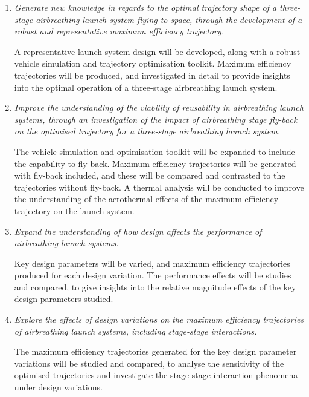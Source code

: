     \begin{enumerate}
    	 \item \emph{Generate new knowledge in regards to the optimal trajectory shape of a three-stage airbreathing launch system flying to space, through the development of a robust and representative maximum efficiency trajectory.}
    	 
    	 A representative launch system design will be developed, along with a robust vehicle simulation and trajectory optimisation toolkit. Maximum efficiency trajectories will be produced, and investigated in detail to provide insights into the optimal operation of a three-stage airbreathing launch system.  
    	    \\
\item \emph{Improve the understanding of the viability of reusability in airbreathing launch systems, through an investigation of the impact of airbreathing stage fly-back on the optimised trajectory for a three-stage airbreathing launch system. }

The vehicle simulation and optimisation toolkit will be expanded to include the capability to fly-back. Maximum efficiency trajectories will be generated with fly-back included, and these will be compared and contrasted to the trajectories without fly-back. A thermal analysis will be conducted to improve the understanding of the aerothermal effects of the maximum efficiency trajectory on the launch system. 
 \\
      \item \emph{Expand the understanding of how design affects the performance of airbreathing launch systems. }
      
      Key design parameters will be varied, and maximum efficiency trajectories produced for each design variation. The performance effects will be studies and compared, to give insights into the relative magnitude effects of the key design parameters studied. 
\\
\item \emph{Explore the effects of design variations on the maximum efficiency trajectories of airbreathing launch systems, including stage-stage interactions. }

The maximum efficiency trajectories generated for the key design parameter variations will be studied and compared, to analyse the sensitivity of the optimised trajectories and investigate the stage-stage interaction phenomena under design variations. 
\\
    \end{enumerate}

